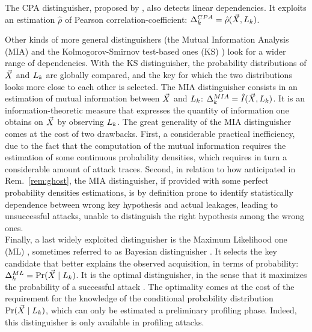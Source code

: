 The CPA distinguisher, proposed by \cite{brier2004correlation}, also detects linear dependencies. It exploits an estimation $\hat{\rho}$ of Pearson correlation-coefficient: $\Delta^{CPA}_{k} = \hat{\rho}(\vec{X}, L_k )$.


Other kinds of more general distinguishers (\eg the Mutual Information Analysis (MIA) \cite{gierlichs2008mutual,batina2011mutual} and the Kolmogorov-Smirnov test-based ones (KS) \cite{veyrat2009mutual}) look for a wider range of dependencies. With the KS distinguisher, the probability distributions of $\vec{X}$ and $L_k$ are globally compared, and the key for which the two distributions looks more close to each other is selected. The MIA distinguisher consists in an estimation of mutual information between $\vec{X}$ and $L_k$: $\Delta^{MIA}_{k} = \hat{I}(\vec{X}, L_k )$. It is an information-theoretic measure that expresses the quantity of information one obtains on $\vec{X}$ by observing $L_k$. The great generality of the MIA distinguisher comes at the cost of two drawbacks. First, a considerable practical inefficiency, due to the fact that the computation of the mutual information requires the estimation of some continuous probability densities, which requires in turn a considerable amount of attack traces. Second, in relation to how anticipated in Rem.~\ref{rem:ghost}, the MIA distinguisher, if provided with some perfect probability densities estimations, is by definition prone to identify statistically dependence between wrong key hypothesis and actual leakages, leading to unsuccessful attacks, unable to distinguish the right hypothesis among the wrong ones.  \\

Finally, a last widely exploited distinguisher is the Maximum Likelihood one (ML) \cite{Chari2003}, sometimes referred to as Bayesian distinguisher \cite{mangard2011one}. It selects the key candidate that better explains the observed acquisition, in terms of probability: $\distinguisher^{ML}_{\keyVar} = \prob(\given{\vaLeakVec}{\leakageModel_\keyVar})$.  It is the optimal distinguisher, in the sense that it maximizes the probability of a successful attack \cite{heuser2014good}. The optimality comes at the cost of the requirement for the knowledge of the conditional probability distribution $\prob(\given{\vaLeakVec}{\leakageModel_\keyVar})$, which can only be estimated \via a preliminary profiling phase. Indeed, this distinguisher is only available in profiling attacks.\\

